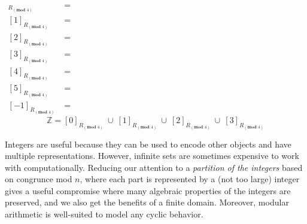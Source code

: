 \documentclass[12pt, oneside]{article}
\begin{document}
\begin{align*}
    [0]_{R_{(\textbf{mod } 4)}} &= \phantom{ \{ x \in \mathbb{Z} \mid x \equiv 0 ((\textbf{mod } 4)) \} 
    = \{ x \in \mathbb{Z} \mid x \textbf{ mod } 4 = 0 \textbf{ mod } 4 = 0 \} = \{ 4c \mid c \in \mathbb{Z}\} }\\
    [1]_{R_{(\textbf{mod } 4)}} &= \phantom{ \{ x \in \mathbb{Z} \mid x \equiv 1 ((\textbf{mod } 4)) \} 
    = \{ x \in \mathbb{Z} \mid x \textbf{ mod } 4 = 1 \textbf{ mod } 4 = 1 \} = \{ 4c+1 \mid c \in \mathbb{Z}\} }\\
    [2]_{R_{(\textbf{mod } 4)}} &= \phantom{ \{ x \in \mathbb{Z} \mid x \equiv 2 ((\textbf{mod } 4)) \} 
    = \{ x \in \mathbb{Z} \mid x \textbf{ mod } 4 = 2 \textbf{ mod } 4 = 0 \} = \{ 4c+2 \mid c \in \mathbb{Z}\} }\\
    [3]_{R_{(\textbf{mod } 4)}} &= \phantom{ \{ x \in \mathbb{Z} \mid x \equiv 3 ((\textbf{mod } 4)) \} 
    = \{ x \in \mathbb{Z} \mid x \textbf{ mod } 4 = 3 \textbf{ mod } 4 = 3 \} = \{ 4c+3 \mid c \in \mathbb{Z}\} }\\
    [4]_{R_{(\textbf{mod } 4)}} &= \phantom{ \{ x \in \mathbb{Z} \mid x \equiv 4 ((\textbf{mod } 4)) \} 
    = \{ x \in \mathbb{Z} \mid x \textbf{ mod } 4 = 4 \textbf{ mod } 4 = 0 \} = \{ 4c \mid c \in \mathbb{Z}\} }\\
    [5]_{R_{(\textbf{mod } 4)}} &= \phantom{ \{ x \in \mathbb{Z} \mid x \equiv 5 ((\textbf{mod } 4)) \} 
    = \{ x \in \mathbb{Z} \mid x \textbf{ mod } 4 = 5 \textbf{ mod } 4 = 1 \} = \{ 4c+1 \mid c \in \mathbb{Z}\} }\\
    [-1]_{R_{(\textbf{mod } 4)}} &= \phantom{ \{ x \in \mathbb{Z} \mid x \equiv -1 ((\textbf{mod } 4)) \} 
    = \{ x \in \mathbb{Z} \mid x \textbf{ mod } 4 = -1 \textbf{ mod } 4 = 3 \} = \{ 4c+3 \mid c \in \mathbb{Z}\} }
\end{align*}
\[
\mathbb{Z} =  [0]_{R_{(\textbf{mod } 4)}}~ \cup ~[1]_{R_{(\textbf{mod } 4)}} ~\cup~[2]_{R_{(\textbf{mod } 4)}}~\cup~
[3]_{R_{(\textbf{mod } 4)}}
\]





 \vfill


Integers are useful because they can be used to encode other objects
and have multiple representations. However, infinite sets are sometimes
expensive to work with computationally. Reducing our attention to 
a {\it partition of the integers} based on congrunce mod $n$, where
each part is represented by a (not too large) integer gives a useful 
compromise where many algebraic properties of the integers are preserved, 
and we also get the benefits of a finite domain. Moreover, modular arithmetic
is well-suited to model any cyclic behavior. \vfill
\newpage
\end{document}
